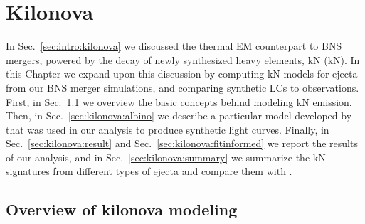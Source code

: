 
\chapter{Kilonova} \label{ch:kilonova} 

In Sec.~\ref{sec:intro:kilonova} we discussed the thermal \ac{EM} 
counterpart to \ac{BNS} mergers, powered by the decay of newly 
synthesized heavy elements, \acl{kN} (\acs{kN}). 
In this Chapter we expand upon this discussion by computing 
\ac{kN} models for ejecta from our \ac{BNS} merger simulations, and comparing 
synthetic \acp{LC} to observations.
%
First, in Sec.~\ref{sec:kilonova:modeling} we overview the basic 
concepts behind modeling \ac{kN} emission. 
%
Then, in Sec.~\ref{sec:kilonova:albino} we describe a particular model  
developed by \cite{Perego:2017wtu} that was used in our analysis 
to produce synthetic light curves. 
%
Finally, in Sec.~\ref{sec:kilonova:result} and Sec.~\ref{sec:kilonova:fitinformed}
we report the results of our analysis, and in 
Sec.~\ref{sec:kilonova:summary} we summarize the \ac{kN} signatures 
from different types of ejecta and compare them with \AT{}.





\section{Overview of kilonova modeling} \label{sec:kilonova:modeling}

